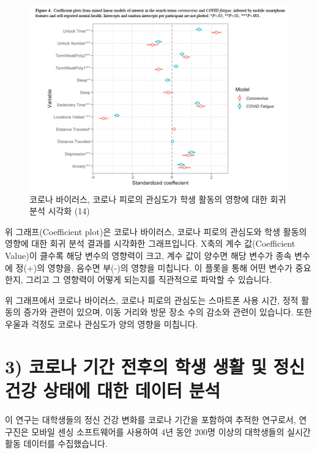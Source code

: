 \documentclass[
  letterpaper,
]{book}
\begin{document}
\begin{figure}[H]

{\centering \includegraphics{img/fig12.png}

}

\caption{코로나 바이러스, 코로나 피로의 관심도가 학생 활동의 영향에 대한
회귀 분석 시각화 (14)}

\end{figure}%

위 그래프(Coefficient plot)은 코로나 바이러스, 코로나 피로의 관심도와
학생 활동의 영향에 대한 회귀 분석 결과를 시각화한 그래프입니다. X축의
계수 값(Coefficient Value)이 클수록 해당 변수의 영향력이 크고, 계수 값이
양수면 해당 변수가 종속 변수에 정(+)의 영향을, 음수면 부(-)의 영향을
미칩니다. 이 플롯을 통해 어떤 변수가 중요한지, 그리고 그 영향력이 어떻게
되는지를 직관적으로 파악할 수 있습니다.

위 그래프에서 코로나 바이러스, 코로나 피로의 관심도는 스마트폰 사용
시간, 정적 활동의 증가와 관련이 있으며, 이동 거리와 방문 장소 수의
감소와 관련이 있습니다. 또한 우울과 걱정도 코로나 관심도가 양의 영향을
미칩니다.

\section{3) 코로나 기간 전후의 학생 생활 및 정신 건강 상태에 대한 데이터
분석}\label{uxcf54uxb85cuxb098-uxae30uxac04-uxc804uxd6c4uxc758-uxd559uxc0dd-uxc0dduxd65c-uxbc0f-uxc815uxc2e0-uxac74uxac15-uxc0c1uxd0dcuxc5d0-uxb300uxd55c-uxb370uxc774uxd130-uxbd84uxc11d}

이 연구는 대학생들의 정신 건강 변화를 코로나 기간을 포함하여 추적한
연구로서, 연구진은 모바일 센싱 소프트웨어를 사용하여 4년 동안 200명
이상의 대학생들의 실시간 활동 데이터를 수집했습니다.
\end{document}
